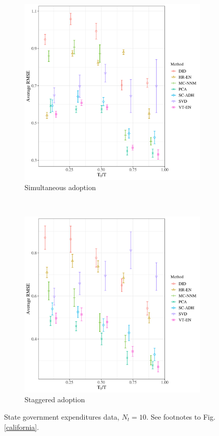 \documentclass[12pt]{article}
\begin{document}
\begin{figure}[htbp]
	\centering
	\begin{subfigure}[t]{0.45\textwidth}
		\centering
		\includegraphics[width=\textwidth]{plots/exp_pc_N_19_T_159_numruns_20_num_treated_10_simultaneuous_1.png}
		\caption{Simultaneous adoption} 
	\end{subfigure}
	~ 
	\begin{subfigure}[t]{0.45\textwidth}
		\centering
		\includegraphics[width=\textwidth]{plots/exp_pc_N_19_T_159_numruns_20_num_treated_10_simultaneuous_0.png}
		\caption{Staggered adoption}
	\end{subfigure}
	\caption{State government expenditures data, $N_t = 10$. See footnotes to Fig. \ref{california}. \label{exp-pc}} 
\end{figure}
\end{document}
